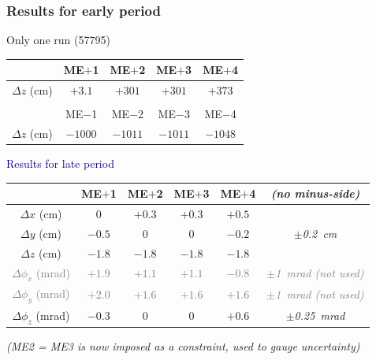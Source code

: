 \documentclass[compress]{beamer}
\begin{document}
\begin{frame}
\frametitle{Results for early period}
\small

Only one run (57795)

\vspace{0.2 cm}
\renewcommand{\arraystretch}{1.05}
\begin{tabular}{c c c c c}
 & ME$+$1 & ME$+$2 & ME$+$3 & ME$+$4 \\\hline
$\Delta z$ (cm) & $+3.1$ & $+301$ & $+301$ & $+373$ \\
& & & & \\
 & ME$-$1 & ME$-$2 & ME$-$3 & ME$-$4 \\\hline
$\Delta z$ (cm) & $-1000$ & $-1011$ & $-1011$ & $-1048$ \\
\end{tabular}

\vspace{0.6 cm}
\hspace{-0.83 cm} \textcolor{darkblue}{\Large Results for late period}

\vspace{0.2 cm}
\renewcommand{\arraystretch}{1.1}
\begin{tabular}{c c c c c c}
 & ME$+$1 & ME$+$2 & ME$+$3 & ME$+$4 & {\it (no minus-side)} \\\hline
$\Delta x$ (cm) & $0$ & $+0.3$ & $+0.3$ & $+0.5$ & \\
$\Delta y$ (cm) & $-0.5$ & $0$ & $0$ & $-0.2$ & {\it $\pm$0.2~cm} \\
$\Delta z$ (cm) & $-1.8$ & $-1.8$ & $-1.8$ & $-1.8$ & \\
\textcolor{gray}{$\Delta \phi_x$ (mrad)} & \textcolor{gray}{$+1.9$} & \textcolor{gray}{$+1.1$} & \textcolor{gray}{$+1.1$} & \textcolor{gray}{$-0.8$} & \textcolor{gray}{{\it $\pm$1~mrad (not used)}} \\
\textcolor{gray}{$\Delta \phi_y$ (mrad)} & \textcolor{gray}{$+2.0$} & \textcolor{gray}{$+1.6$} & \textcolor{gray}{$+1.6$} & \textcolor{gray}{$+1.6$} & \textcolor{gray}{{\it $\pm$1~mrad (not used)}} \\
$\Delta \phi_z$ (mrad) & $-0.3$ & $0$ & $0$ & $+0.6$ & {\it $\pm$0.25~mrad} \\
\end{tabular}

\vspace{0.2 cm}
{\it \scriptsize (ME2 = ME3 is now imposed as a constraint, used to gauge uncertainty)}
\end{frame}
\end{document}
